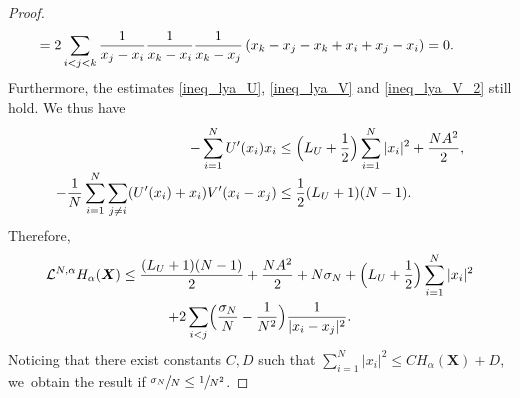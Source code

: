 \documentclass[10pt]{amsart}
\newcommand{\bX}{{\boldsymbol{X}}}
\theoremstyle{plain}
\theoremstyle{definition}
\begin{document}
\begin{proof}
\begin{align*}
&\hspace*{-.4cm}=2\sum_{i<j<k}\frac{1}{x_j-x_i}\frac{1}{x_k-x_i}\frac{1}{x_k-x_j}\left(x_k-x_j-x_k+x_i+x_j-x_i\right)=0.
\end{align*}
Furthermore, the estimates \eqref{ineq_lya_U}, \eqref{ineq_lya_V} and \eqref{ineq_lya_V_2} still hold. We thus have
\begin{align*}
-\sum_{i=1}^N U'(x_i)x_i&\leq\Bigl(L_U+\frac{1}{2}\Bigr)\sum_{i=1}^N|x_i|^2+\frac{NA^2}{2},\\[-3pt]
-\frac{1}{N}\sum_{i=1}^N\sum_{j\neq i}(U'(x_i)+x_i)V'(x_i-x_j)&\leq \frac{1}{2}(L_U+1)(N-1).
\end{align*}
Therefore,
\begin{multline*}
\mathcal{L}^{N,\alpha} H_\alpha(\bX)\leq \frac{(L_U+1)(N-1)}{2}+\frac{NA^2}{2}+N\sigma_N+\Bigl(L_U+\frac{1}{2}\Bigr)\sum_{i=1}^N|x_i|^2\\
+2\sum_{i<j}\Bigl(\frac{\sigma_N}{N}-\frac{1}{N^2}\Bigr)\frac{1}{|x_i-x_j|^2}.
\end{multline*}
Noticing that there exist constants $C,D$ such that $\sum_{i=1}^N|x_i|^2\leq CH_{\alpha}(\bX)+D$, we~obtain the result if $\sfrac{\sigma_N}{N}\leq\sfrac{1}{N^2}$.
\end{proof}
\end{document}
